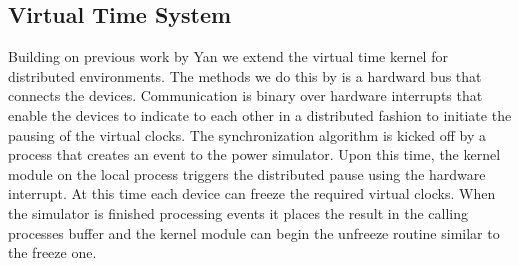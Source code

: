 \subsection{Virtual Time System}
Building on previous work by Yan \cite{Yan:VTS:pads15} we extend the virtual time kernel for distributed environments. The methods we do this by is a hardward bus that connects the devices. Communication is binary over hardware interrupts that enable the devices to indicate to each other in a distributed fashion to initiate the pausing of the virtual clocks. The synchronization algorithm is kicked off by a process that creates an event to the power simulator. Upon this time, the kernel module on the local process triggers the distributed pause using the hardware interrupt. At this time each device can freeze the required virtual clocks. When the simulator is finished processing events it places the result in the calling processes buffer and the kernel module can begin the unfreeze routine similar to the freeze one.
